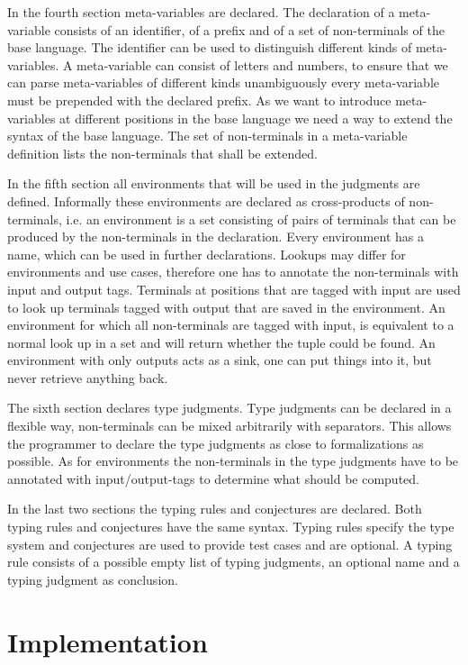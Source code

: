 \documentclass[a4paper,twoside]{report}
\begin{document}
In the fourth section meta-variables are declared. The declaration of
a meta-variable consists of an identifier, of a prefix and of a set of
non-terminals of the base language. The identifier can be used to
distinguish different kinds of meta-variables. A meta-variable can consist of letters and numbers, to
ensure that we can parse meta-variables of different kinds
unambiguously every meta-variable must be prepended with the declared
prefix. As we want to introduce meta-variables at different positions
in the base language we need a way to extend the syntax of the base
language. The set of non-terminals in a meta-variable definition lists
the non-terminals that shall be extended.

In the fifth section all environments that will be used in the
judgments are defined. Informally these environments are declared as
cross-products of non-terminals, i.e. an environment is a set
consisting of pairs of terminals that can be produced by the
non-terminals in the declaration. Every environment has a name, which
can be used in further declarations. Lookups may differ for
environments and use cases, therefore one has to annotate the
non-terminals with input and output tags. Terminals at positions that
are tagged with input are used to look up terminals tagged with output
that are saved in the environment. An environment for which all
non-terminals are tagged with input, is equivalent to a normal look up
in a set and will return whether the tuple could be found. An
environment with only outputs acts as a sink, one can put things into
it, but never retrieve anything back.

The sixth section declares type judgments. Type judgments can be
declared in a flexible way, non-terminals can be mixed arbitrarily
with separators. This allows the programmer to declare the type judgments as close to formalizations as
possible. As for environments the non-terminals in the type judgments
have to be annotated with input/output-tags to determine what should
be computed.

In the last two sections the typing rules and conjectures are
declared. Both typing rules and conjectures have the same
syntax. Typing rules specify the type system and conjectures are used
to provide test cases and are optional. A typing rule consists of a possible empty list
of typing judgments, an optional name and a typing judgment as
conclusion.
\section{Implementation}
\end{document}
